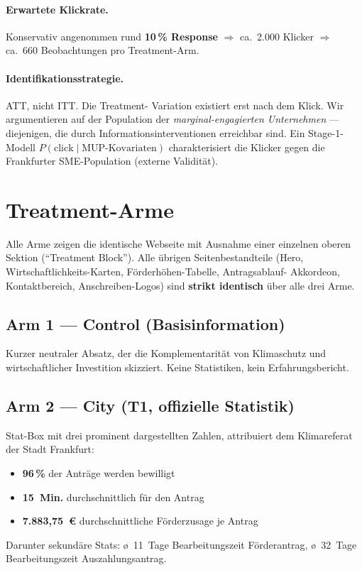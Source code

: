 \documentclass[11pt, a4paper]{scrartcl}
\begin{document}
\paragraph{Erwartete Klickrate.} Konservativ angenommen rund
\textbf{10\,\% Response} $\Rightarrow$ ca.~2.000 Klicker $\Rightarrow$
ca.~660 Beobachtungen pro Treatment-Arm.

\paragraph{Identifikationsstrategie.} ATT, nicht ITT. Die Treatment-
Variation existiert erst nach dem Klick. Wir argumentieren auf der
Population der \emph{marginal-engagierten Unternehmen} --- diejenigen,
die durch Informationsinterventionen erreichbar sind. Ein Stage-1-Modell
\(P(\text{click} \mid \text{MUP-Kovariaten})\) charakterisiert die Klicker
gegen die Frankfurter SME-Population (externe Validität).

\section{Treatment-Arme}

Alle Arme zeigen die identische Webseite mit Ausnahme einer einzelnen
oberen Sektion (\enquote{Treatment Block}). Alle übrigen Seitenbestandteile
(Hero, Wirtschaftlichkeits-Karten, Förderhöhen-Tabelle, Antragsablauf-
Akkordeon, Kontaktbereich, Anschreiben-Logos) sind \textbf{strikt identisch}
über alle drei Arme.

\subsection*{Arm 1 --- Control (Basisinformation)}
Kurzer neutraler Absatz, der die Komplementarität von Klimaschutz und
wirtschaftlicher Investition skizziert. Keine Statistiken, kein
Erfahrungsbericht.

\subsection*{Arm 2 --- City (T1, offizielle Statistik)}
Stat-Box mit drei prominent dargestellten Zahlen, attribuiert dem
Klimareferat der Stadt Frankfurt:
\begin{itemize}
    \item \textbf{96\,\%} der Anträge werden bewilligt
    \item \textbf{15~Min.} durchschnittlich für den Antrag
    \item \textbf{7.883,75~\euro} durchschnittliche Förderzusage je Antrag
\end{itemize}
Darunter sekundäre Stats: ø~11~Tage Bearbeitungszeit Förderantrag,
ø~32~Tage Bearbeitungszeit Auszahlungsantrag.
\end{document}
